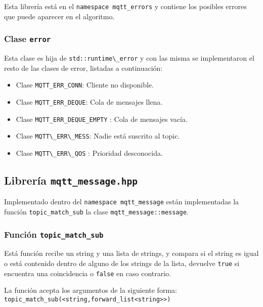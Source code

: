 Esta librería está en el \texttt{namespace mqtt\_errors} y contiene los posibles errores que puede aparecer en el algoritmo. 

\subsubsection{Clase \texttt{error}}

Esta clase es  hija de \verb|std::runtime\_error| y con las misma se implementaron el resto de las clases de error, listadas a continuación:

\begin{itemize}
    \item Clase \verb|MQTT_ERR_CONN|:
        Cliente no disponible.
    
    \item Clase \verb|MQTT_ERR_DEQUE|:
        Cola de mensajes llena.
    
    \item Clase \verb|MQTT_ERR_DEQUE_EMPTY| :
        Cola de mensajes vacía.
    
    \item Clase \verb|MQTT\_ERR\_MESS|:
        Nadie está suscrito al topic.
    
    \item Clase \verb|MQTT\_ERR\_QOS|    :
        Prioridad desconocida.
    
\end{itemize}


\subsection{Librería \texttt{mqtt\_message.hpp}}

Implementado dentro del \texttt{namespace mqtt\_message} están  implementadas la función \verb|topic_match_sub| la clase \texttt{mqtt\_message::message}.

\subsubsection{Función \texttt{topic\_match\_sub}}

Está función recibe un string y una lista de strings, y compara si el string es igual o está contenido dentro de alguno de los strings de la lista, devuelve \verb|true| si encuentra una coincidencia o \verb|false| en caso contrario.

La función acepta los argumentos de la siguiente forma:
\verb|topic_match_sub(<string,forward_list<string>>)|

